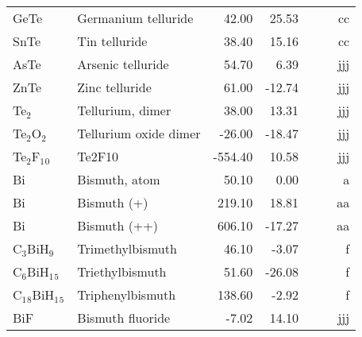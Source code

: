 \begin{table}
\begin{center}
\begin{tabular}{llrrrrr}
 GeTe        & Germanium telluride                    &    42.00    &    25.53  &  & &     cc\\
 SnTe        & Tin telluride                          &    38.40    &    15.16  &  & &     cc\\
 AsTe        & Arsenic telluride                      &    54.70    &     6.39  &  &  &    jjj\\
 ZnTe        & Zinc telluride                         &    61.00    &   -12.74  &  &  &    jjj\\
 Te$_2$         & Tellurium, dimer                       &    38.00    &    13.31  &  &  &    jjj\\
 Te$_2$O$_2$       & Tellurium oxide dimer                  &   -26.00    &   -18.47  &  &  &    jjj\\
 Te$_2$F$_1$$_0$      & Te2F10                                 &  -554.40    &    10.58  &  &  &    jjj\\
 Bi          & Bismuth, atom                          &    50.10    &     0.00  &  &  &      a\\
 Bi          & Bismuth (+)                            &   219.10    &    18.81  &  &  &     aa\\
 Bi          & Bismuth (++)                           &   606.10    &   -17.27  &  &  &     aa\\
 C$_3$BiH$_9$      & Trimethylbismuth                       &    46.10    &    -3.07  &  &  &      f\\
 C$_6$BiH$_1$$_5$     & Triethylbismuth                        &    51.60    &   -26.08  &  &  &      f\\
 C$_1$$_8$BiH$_1$$_5$    & Triphenylbismuth                       &   138.60    &    -2.92  &  &  &      f\\
 BiF         & Bismuth fluoride                       &    -7.02    &    14.10  &  &  &    jjj\\
\hline
\end{tabular}
\end{center}
\end{table}
\clearpage

